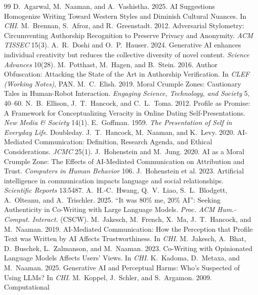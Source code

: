 \documentclass[sigconf,nonacm]{acmart}
\begin{document}
\clearpage
\begin{thebibliography}{99}
 D.~Agarwal, M.~Naaman, and A.~Vashistha. 2025. AI
Suggestions Homogenize Writing Toward Western Styles and Diminish Cultural
Nuances. In \emph{CHI}.
 M.~Brennan, S.~Afroz, and R.~Greenstadt. 2012. Adversarial
Stylometry: Circumventing Authorship Recognition to Preserve Privacy and
Anonymity. \emph{ACM TISSEC} 15(3).
 A.~R.~Doshi and O.~P.~Hauser. 2024. Generative AI enhances
individual creativity but reduces the collective diversity of novel content.
\emph{Science Advances} 10(28).
 M.~Potthast, M.~Hagen, and B.~Stein. 2016. Author
Obfuscation: Attacking the State of the Art in Authorship Verification. In
\emph{CLEF (Working Notes)}, PAN.
 M.~C.~Elish. 2019. Moral Crumple Zones: Cautionary Tales in
Human-Robot Interaction. \emph{Engaging Science, Technology, and Society} 5,
40--60.
 N.~B.~Ellison, J.~T.~Hancock, and C.~L.~Toma. 2012. Profile
as Promise: A Framework for Conceptualizing Veracity in Online Dating
Self-Presentations. \emph{New Media \& Society} 14(1).
 E.~Goffman. 1959. \emph{The Presentation of Self in
Everyday Life}. Doubleday.
 J.~T.~Hancock, M.~Naaman, and K.~Levy. 2020. AI-Mediated
Communication: Definition, Research Agenda, and Ethical Considerations.
\emph{JCMC} 25(1).
 J.~Hohenstein and M.~Jung. 2020. AI as a Moral Crumple
Zone: The Effects of AI-Mediated Communication on Attribution and Trust.
\emph{Computers in Human Behavior} 106.
 J.~Hohenstein et al. 2023. Artificial intelligence in
communication impacts language and social relationships. \emph{Scientific
Reports} 13:5487.
 A.~H.-C.~Hwang, Q.~V.~Liao, S.~L.~Blodgett, A.~Olteanu, and
A.~Trischler. 2025. ``It was 80\% me, 20\% AI'': Seeking Authenticity in
Co-Writing with Large Language Models. \emph{Proc. ACM Hum.-Comput. Interact.}
(CSCW).
 M.~Jakesch, M.~French, X.~Ma, J.~T.~Hancock, and
M.~Naaman. 2019. AI-Mediated Communication: How the Perception that Profile
Text was Written by AI Affects Trustworthiness. In \emph{CHI}.
 M.~Jakesch, A.~Bhat, D.~Buschek, L.~Zalmanson, and
M.~Naaman. 2023. Co-Writing with Opinionated Language Models Affects Users'
Views. In \emph{CHI}.
 K.~Kadoma, D.~Metaxa, and M.~Naaman. 2025. Generative AI and
Perceptual Harms: Who's Suspected of Using LLMs? In \emph{CHI}.
 M.~Koppel, J.~Schler, and S.~Argamon. 2009. Computational

\end{thebibliography}
\end{document}
